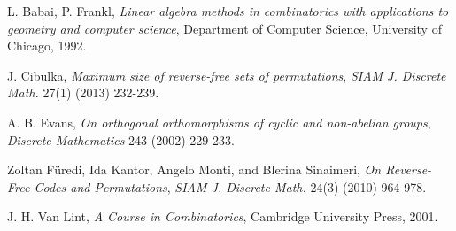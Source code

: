 \documentclass[12pt]{article}
\begin{document}
\begin{thebibliography}{10}

L. Babai, P. Frankl, 
{\em Linear algebra methods in combinatorics with applications to geometry
and computer science}, Department of Computer Science, University of
Chicago, 1992.

J. Cibulka,
{\em Maximum size of reverse-free sets of permutations},
{\em SIAM J. Discrete Math.} 27(1) (2013) 232-239.

A. B. Evans, {\em On orthogonal orthomorphisms of cyclic and non-abelian groups}, 
{\em Discrete Mathematics} 243 (2002) 229-233.

Zoltan F\"{u}redi, Ida Kantor, Angelo Monti, and Blerina Sinaimeri,
{\em On Reverse-Free Codes and Permutations},
{\em SIAM J. Discrete Math.} 24(3) (2010) 964-978.


J. H. Van Lint, {\em A Course in Combinatorics}, Cambridge University Press,
2001.


\end{thebibliography}
\end{document}
